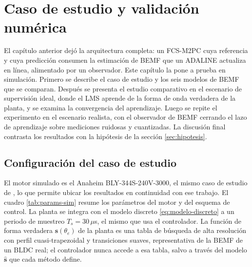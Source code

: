 \documentclass[../../../Tesis_JALS_Maestria.tex]{subfiles}
\begin{document}
\chapter{Caso de estudio y validación numérica}
\label{cap:validacion}

El capítulo anterior dejó la arquitectura completa: un FCS-M2PC cuya referencia y cuya predicción consumen la estimación de BEMF que un ADALINE actualiza en línea, alimentado por un observador. Este capítulo la pone a prueba en simulación. Primero se describe el caso de estudio y los seis modelos de BEMF que se comparan. Después se presenta el estudio comparativo en el escenario de supervisión ideal, donde el LMS aprende de la forma de onda verdadera de la planta, y se examina la convergencia del aprendizaje. Luego se repite el experimento en el escenario realista, con el observador de BEMF cerrando el lazo de aprendizaje sobre mediciones ruidosas y cuantizadas. La discusión final contrasta los resultados con la hipótesis de la sección \ref{sec:hipotesis}.

\section{Configuración del caso de estudio}
\label{sec:config}

El motor simulado es el Anaheim BLY-344S-240V-3000, el mismo caso de estudio de \citet{coronado2025}, lo que permite ubicar los resultados en continuidad con ese trabajo. El cuadro \ref{tab:params-sim} resume los parámetros del motor y del esquema de control. La planta se integra con el modelo discreto \eqref{eq:modelo-discreto} a un periodo de muestreo $T_s = 30\,\mu$s, el mismo que usa el controlador. La función de forma verdadera $\mathbf{s}(\theta_e)$ de la planta es una tabla de búsqueda de alta resolución con perfil cuasi-trapezoidal y transiciones suaves, representativa de la BEMF de un BLDC real; el controlador nunca accede a esa tabla, salvo a través del modelo $\hat{\mathbf{s}}$ que cada método define.
\end{document}
